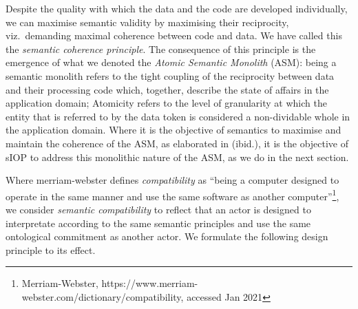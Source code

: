 \documentclass[sort&compress,preprint,authoryear,3p,twocolumn]{elsarticle}
\begin{document}
Despite the quality with which the data and the code are developed
individually, we can maximise semantic validity by maximising their
reciprocity, viz.~demanding maximal coherence between code and data. We
have called this the \emph{semantic coherence principle}. The
consequence of this principle is the emergence of what we denoted the
\emph{Atomic Semantic Monolith} (ASM): being a semantic monolith refers
to the tight coupling of the reciprocity between data and their
processing code which, together, describe the state of affairs in the
application domain; Atomicity refers to the level of granularity at
which the entity that is referred to by the data token is considered a
non-dividable whole in the application domain. Where it is the objective
of semantics to maximise and maintain the coherence of the ASM, as
elaborated in (ibid.), it is the objective of sIOP to address this
monolithic nature of the ASM, as we do in the next section.

Where merriam-webster defines \emph{compatibility} as ``being a computer
designed to operate in the same manner and use the same software as
another computer''\footnote{Merriam-Webster,
  https://www.merriam-webster.com/dictionary/compatibility, accessed Jan
  2021}, we consider \emph{semantic compatibility} to reflect that an
actor is designed to interpretate according to the same semantic
principles and use the same ontological commitment as another actor. We
formulate the following design principle to its effect.
\end{document}
